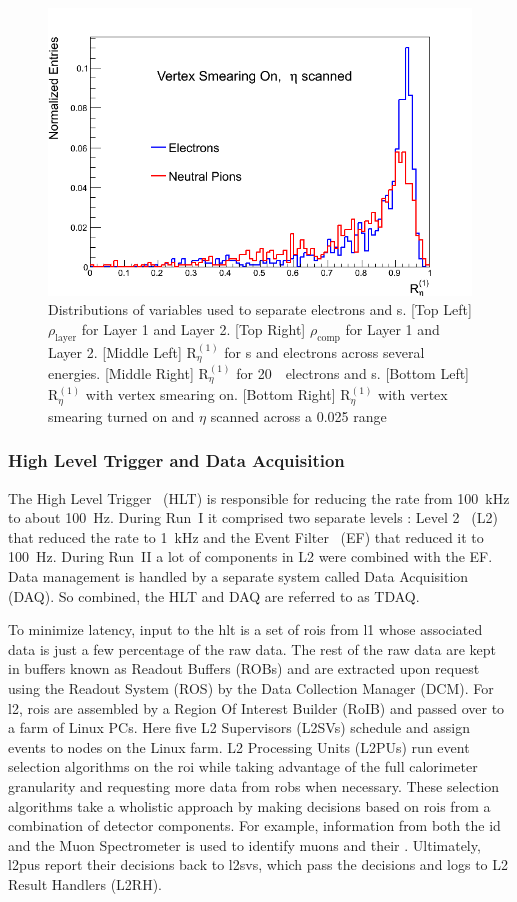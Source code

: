 \begin{figure}[!h]
  \includegraphics[width=0.5\linewidth]{figures/Scan.png}%
	\caption{Distributions of variables used to separate electrons and \pizero s. 
[Top Left] $\rho_{\textrm{layer}}$ for Layer 1 and Layer 2. [Top Right] $\rho_{\textrm{comp}}$ for 
Layer 1 and Layer 2. [Middle Left] $\textrm{R}_{\eta}^{(1)}$ for \pizero s and electrons across 
several energies. [Middle Right]  $\textrm{R}_{\eta}^{(1)}$ for 20~\GeV\ electrons and \pizero s.
[Bottom Left] $\textrm{R}_{\eta}^{(1)}$ with vertex smearing on. [Bottom Right] $\textrm{R}_{\eta}^{(1)}$
 with vertex smearing turned on and $\eta$ scanned across a 0.025 range}
	\label{fig:bnlRes}
\end{figure}

\subsubsection{High Level Trigger and Data Acquisition}
\label{sec:hlt}
\par The High Level Trigger~\cite{5321918} (HLT) is responsible for reducing the rate from \SI{100}{\kilo\hertz} 
to about \SI{100}{\hertz}. During Run~I it comprised two separate levels : Level 2~\cite{dosanjos:in2p3-00148815} (L2)
 that reduced the rate to \SI{1}{\kilo\hertz} and the Event Filter~\cite{Negri2007} (EF) that reduced 
it to \SI{100}{\hertz}. During Run~II a lot of components in L2 were combined with the EF.
 Data management is handled by a separate system 
called Data Acquisition~\cite{5321758} (DAQ). So combined, the HLT and DAQ are referred to as TDAQ. 

\par To minimize latency, input to the \acrshort{hlt} is a set of \acrshort{roi}s from \acrshort{l1} 
whose associated data is just a few percentage of the raw data. The rest of the raw data 
are kept in buffers known as Readout Buffers (ROBs) and are extracted upon request using the
Readout System (ROS) by the Data Collection Manager (DCM). For \acrshort{l2}, \acrshort{roi}s are assembled by a 
Region Of Interest Builder (RoIB) and passed over to a farm of Linux PCs.
Here five L2 Supervisors (L2SVs) schedule and assign events to nodes on the Linux farm. 
L2 Processing Units (L2PUs) run event selection algorithms on the \acrshort{roi} while taking 
advantage of the full calorimeter granularity and requesting more data 
from \acrshort{rob}s when necessary. These selection algorithms take a wholistic approach by making decisions 
based on \acrshort{roi}s from a combination of detector components. For example, information from both the \acrshort{id}
and the Muon Spectrometer is used to identify muons and their \pT.  
Ultimately, \acrshort{l2pu}s report their decisions back to \acrshort{l2sv}s, which pass the decisions and logs to L2 Result Handlers (L2RH).

